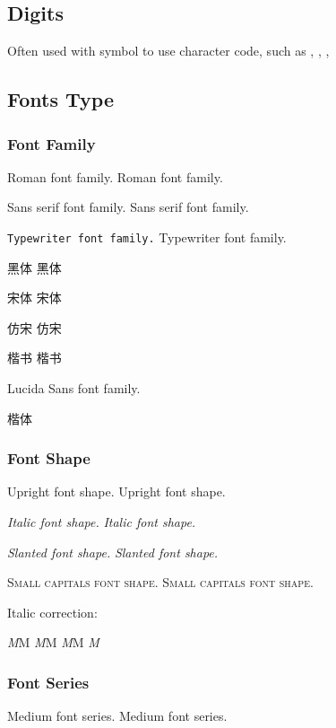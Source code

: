 \subsection{Digits}
Often used with symbol to use character code, such as
,        %
,       %
,      %

\subsection{Fonts Type}
\subsubsection{Font Family}
\textrm{Roman font family.} {\rmfamily Roman font family.}

\textsf{Sans serif font family.} {\sffamily Sans serif font family.}

\texttt{Typewriter font family.} {\ttfamily Typewriter font family.}

{ 黑体} {\heiti 黑体}

{ 宋体} {\songti 宋体}

{ 仿宋} {\fangsong 仿宋}

{ 楷书} {\kaishu 楷书}

{\lucidasans Lucida Sans font family.}  %

{ 楷体}  %

\subsubsection{Font Shape}
\textup{Upright font shape.} {\upshape Upright font shape.}

\textit{Italic font shape.} {\itshape Italic font shape.}

\textsl{Slanted font shape.} {\slshape Slanted font shape.}

\textsc{Small capitals font shape.} {\scshape Small capitals font shape.}

Italic correction: \par
{\itshape M}M       %
{\itshape M\/}M     %
\textit{M}M         %
\textit{M\nocorr}   %

\subsubsection{Font Series}
\textmd{Medium font series.} {\mdseries Medium font series.}

